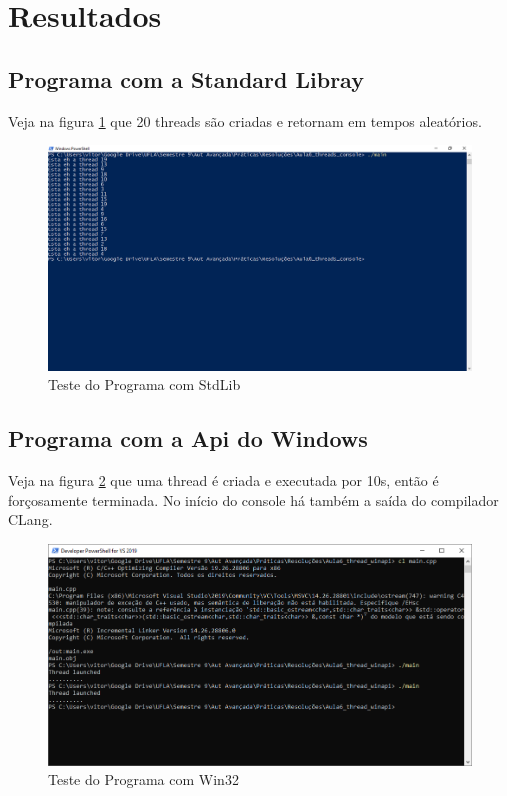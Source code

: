 \documentclass[12pt,a4paper]{article}
\begin{document}
\section{Resultados}
\subsection*{Programa com a Standard Libray}
Veja na figura \ref{test_std} que 20 threads são criadas e retornam em tempos aleatórios.
\begin{figure}[H]
\centering
\includegraphics[width=\textwidth]{thread_std}
\caption{Teste do Programa com StdLib}
\label{test_std}
\end{figure}
\subsection*{Programa com a Api do Windows}
Veja na figura \ref{test_win32} que uma thread é criada e executada por 10s, então é forçosamente terminada. No início do console há também a saída do compilador CLang.
\begin{figure}[H]
\centering
\includegraphics[width=\textwidth]{thread_winapi}
\caption{Teste do Programa com Win32}
\label{test_win32}
\end{figure}
\end{document}
